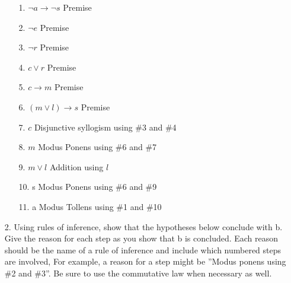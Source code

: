 \begin{enumerate}
\begin{solution}
     \begin{enumerate}
         \item[1.] $\lnot a \rightarrow \lnot s$ \hfill Premise
         \item[2.] $\lnot e$ \hfill Premise
         \item[3.] $\lnot r$ \hfill Premise     
         \item[4.] $c \lor r$ \hfill Premise
         \item[5.] $c \rightarrow m$ \hfill Premise
         \item[6.] $(m \lor l) \rightarrow s$ \hfill Premise
         \item[7.] $c$ \hfill Disjunctive syllogism using \#3 and \#4
         \item[8.] $m$ \hfill Modus Ponens using \#6 and \#7
         \item[9.] $m \lor l$ \hfill Addition using $l$
         \item[10.] s \hfill Modus Ponens using \#6 and \#9
         \item[11.] a \hfill Modus Tollens using \#1 and \#10
     \end{enumerate}

    \end{solution}





    \item[2.] {Using rules of inference, show that the hypotheses below conclude with b. Give the reason for each step as you show that b is concluded. Each reason should be the name of a rule of inference and include which numbered steps are involved, For example, a reason for a step might be ”Modus ponens using \#2 and \#3”. Be sure to use the commutative law when necessary as well.}
    

\end{enumerate}
